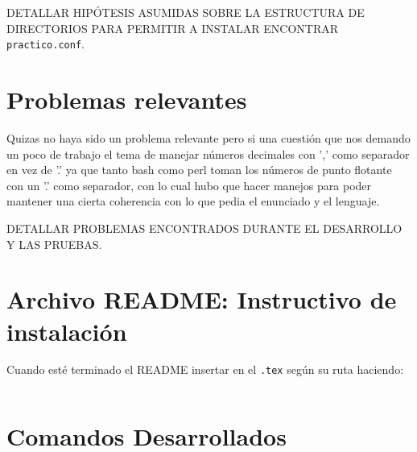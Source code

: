 \documentclass[12pt]{article}
\begin{document}
DETALLAR HIPÓTESIS ASUMIDAS SOBRE LA ESTRUCTURA DE DIRECTORIOS PARA PERMITIR A INSTALAR ENCONTRAR \verb|practico.conf|.

\section{Problemas relevantes}

Quizas no haya sido un problema relevante pero si una cuestión que nos demando un poco de trabajo el tema de manejar números decimales con ',' como separador en vez de '.' ya que tanto bash como perl toman los números de punto flotante con un '.' como separador, con lo cual hubo que hacer manejos para poder mantener una cierta coherencia con lo que pedia el enunciado y el lenguaje.

DETALLAR PROBLEMAS ENCONTRADOS DURANTE EL DESARROLLO Y LAS PRUEBAS.



\section{Archivo README: Instructivo de instalación}
Cuando esté terminado el README insertar en el \verb|.tex| según su ruta haciendo:
\begin{verbatim}

\end{verbatim}

\section{Comandos Desarrollados}
\end{document}

